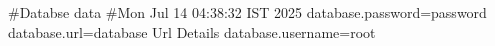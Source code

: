 #Databse data
#Mon Jul 14 04:38:32 IST 2025
database.password=password
database.url=database Url Details
database.username=root
